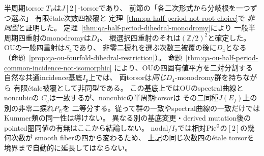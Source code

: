 \begin{remark}[異なる次数四被覆と特異境界]
\label{rem:qa-half-period-versus-root-cover}
半周期torsor $T_P$は$J[2]$-torsorであり、
前節の「各二次形式から分岐根を一つずつ選ぶ」
有限\'{e}tale次数四被覆と
定理~\ref{thm:qa-half-period-not-root-choice}で
\emph{非同型}と証明した。
定理~\ref{thm:qa-half-period-dihedral-monodromy}により
一般半周期四重射のmonodromyは$D_4$、
根選択四重射のそれは$(\mathbb Z/2)^2$と確定した。
OUの一般四重射は$S_4$であり、
非零二捩れを選ぶ次数三被覆の後に$D_4$となる
（命題~\ref{prop:qa-ou-fourfold-dihedral-restriction}）。
命題~\ref{thm:qa-ou-half-period-common-incidence-not-isomorphic}
により、OUの四固有値平方を二対分割する
自然な共通incidence基底$I_{\mathfrak p}$上では、
両torsorは\emph{同じ}$D_4$-monodromy群を持ちながら
有限\'{e}tale被覆として非同型である。
この基底上ではOUのspectral曲線とnoncubicの
$C_q$は一致するが、noncubicの半周期torsorは
その二同種$J(E_f)$上の別の非零二捩れ$P_E$を
二等分する。従って群の一致やspectral曲線の一致だけでは
Kummer類の同一性は導けない。
異なる別の基底変更・derived mutation後の
pointed圏同値の有無はここから結論しない。
nodal/$I_2$では相対$\operatorname{Pic}^0$の$[2]$の幾何次数が
smooth fiberの四から変わるため、
上記の同じ次数四の\'{e}tale torsorを
境界まで自動的に延長してはならない。
\end{remark}
